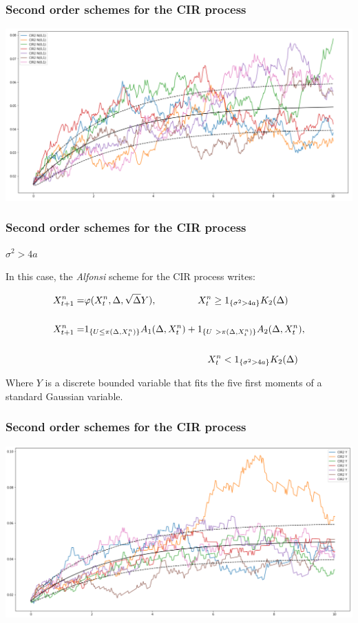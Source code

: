 \documentclass[12pt]{beamer}
\begin{document}
\begin{frame}
	\frametitle{Second order schemes for the CIR process}
	\centering
	\includegraphics[width=\textwidth]{paths_cir2_N.png}
\end{frame}

\begin{frame}
\frametitle{Second order schemes for the CIR process}
\textbf{\Large{$\sigma^2 > 4a$}} 
\vspace{0.5cm}
	
In this case, the \textit{Alfonsi} scheme for the CIR process writes:
	
\begin{align*}
	 X_{t + 1}^n =& \varphi(X_t^n, \Delta, \sqrt{\Delta}Y), \hspace{1.5cm} X_t^n \geq 1_{\{\sigma^2 > 4a \}}K_2(\Delta)\\
	 \\           
     X_{t + 1}^n =& 1_{\{U \leq \pi(\Delta, X_t^n)\}}A_1(\Delta, X_t^n) + 1_{\{U \ > \pi(\Delta, X_t^n)\}}A_2(\Delta, X_t^n), \\
     \\
                  & \hspace{4.5cm}X_t^n < 1_{\{\sigma^2 > 4a \}}K_2(\Delta)
\end{align*}

Where $Y$ is a discrete bounded variable that fits the five first moments of a standard Gaussian variable.	
\end{frame}

\begin{frame}
	\frametitle{Second order schemes for the CIR process}
	\centering
	\includegraphics[width=\textwidth]{paths_cir2_Y.png}
\end{frame}
\end{document}
